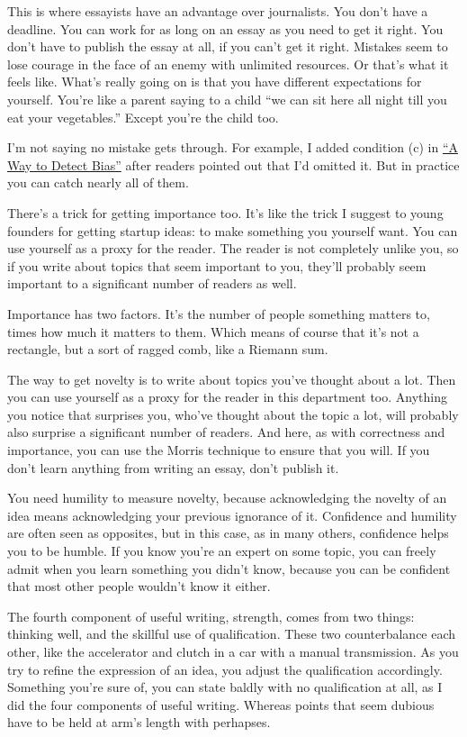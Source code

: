 This is where essayists have an advantage over journalists. You don't
have a deadline. You can work for as long on an essay as you need to get
it right. You don't have to publish the essay at all, if you can't get
it right. Mistakes seem to lose courage in the face of an enemy with
unlimited resources. Or that's what it feels like. What's really going
on is that you have different expectations for yourself. You're like a
parent saying to a child ``we can sit here all night till you eat your
vegetables.'' Except you're the child too.

I'm not saying no mistake gets through. For example, I added condition
(c) in \href{bias.html}{``A Way to Detect Bias''} after readers pointed
out that I'd omitted it. But in practice you can catch nearly all of
them.

There's a trick for getting importance too. It's like the trick I
suggest to young founders for getting startup ideas: to make something
you yourself want. You can use yourself as a proxy for the reader. The
reader is not completely unlike you, so if you write about topics that
seem important to you, they'll probably seem important to a significant
number of readers as well.

Importance has two factors. It's the number of people something matters
to, times how much it matters to them. Which means of course that it's
not a rectangle, but a sort of ragged comb, like a Riemann sum.

The way to get novelty is to write about topics you've thought about a
lot. Then you can use yourself as a proxy for the reader in this
department too. Anything you notice that surprises you, who've thought
about the topic a lot, will probably also surprise a significant number
of readers. And here, as with correctness and importance, you can use
the Morris technique to ensure that you will. If you don't learn
anything from writing an essay, don't publish it.

You need humility to measure novelty, because acknowledging the novelty
of an idea means acknowledging your previous ignorance of it. Confidence
and humility are often seen as opposites, but in this case, as in many
others, confidence helps you to be humble. If you know you're an expert
on some topic, you can freely admit when you learn something you didn't
know, because you can be confident that most other people wouldn't know
it either.

The fourth component of useful writing, strength, comes from two things:
thinking well, and the skillful use of qualification. These two
counterbalance each other, like the accelerator and clutch in a car with
a manual transmission. As you try to refine the expression of an idea,
you adjust the qualification accordingly. Something you're sure of, you
can state baldly with no qualification at all, as I did the four
components of useful writing. Whereas points that seem dubious have to
be held at arm's length with perhapses.

